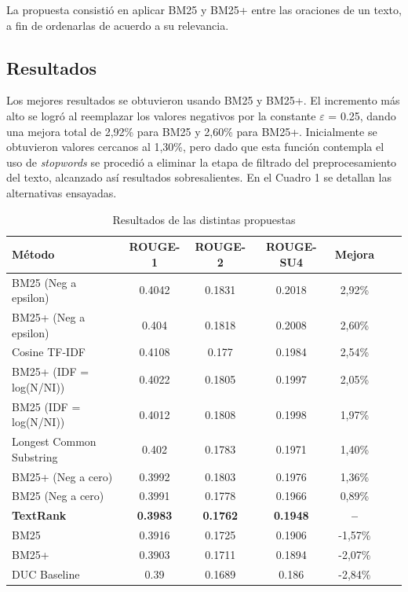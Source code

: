\documentclass{llncs}
\begin{document}
La propuesta consistió en aplicar BM25 y BM25+ entre las oraciones de un texto, a fin de ordenarlas de acuerdo a su relevancia.


\subsection{Resultados}
Los mejores resultados se obtuvieron usando BM25 y BM25+. El incremento más alto se logró al reemplazar los valores negativos por la constante $\varepsilon$ = 0.25, dando una mejora total de 2,92\% para BM25 y 2,60\% para BM25+. Inicialmente se obtuvieron valores cercanos al 1,30\%, pero dado que esta función contempla el uso de \textit{stopwords} se procedió a eliminar la etapa de filtrado del preprocesamiento del texto, alcanzado así resultados sobresalientes. En el Cuadro 1 se detallan las alternativas ensayadas.

\begin{table}
\caption{Resultados de las distintas propuestas}
\begin{center}
\begin{tabular}{l*{5}{c}r}
\hline
\rule{0pt}{12pt}
Método & ROUGE-1 & ROUGE-2 & ROUGE-SU4 & Mejora \\[2pt]
\hline\rule{0pt}{12pt}\mbox{}\par\nobreak
BM25 (Neg a epsilon) & 0.4042 & 0.1831 & 0.2018 & 2,92\% \\
BM25+ (Neg a epsilon) & 0.404 & 0.1818 & 0.2008 & 2,60\% \\
Cosine TF-IDF & 0.4108 & 0.177 & 0.1984 & 2,54\% \\
BM25+ (IDF = log(N/NI)) & 0.4022 & 0.1805 & 0.1997 & 2,05\% \\ 
BM25 (IDF = log(N/NI)) & 0.4012 & 0.1808 & 0.1998 & 1,97\% \\ 
Longest Common Substring & 0.402 & 0.1783 & 0.1971 & 1,40\% \\
BM25+ (Neg a cero) & 0.3992 & 0.1803 & 0.1976 & 1,36\% \\ 
BM25 (Neg a cero) & 0.3991 & 0.1778 & 0.1966 & 0,89\% \\
\textbf{TextRank} & \textbf{0.3983} & \textbf{0.1762} & \textbf{0.1948} & \textbf{--}\\
BM25 & 0.3916 & 0.1725 & 0.1906 & -1,57\% \\
BM25+ & 0.3903 & 0.1711 & 0.1894 & -2,07\% \\
DUC Baseline & 0.39 & 0.1689 & 0.186 & -2,84\% \\ [2pt]
\hline
\end{tabular}
\end{center}
\end{table}
\end{document}
